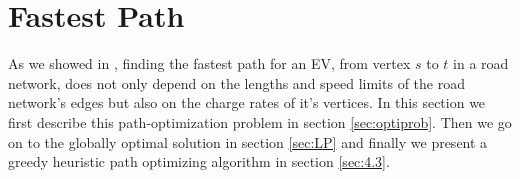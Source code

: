 \section{Fastest Path}

As we showed in , finding the fastest path for an EV, from vertex $s$ to $t$ in a road network, does not only depend on the lengths and speed limits of the road network's edges but also on the charge rates of it's vertices. In this section we first describe this path-optimization problem in section \ref{sec:optiprob}. Then we go on to the globally optimal solution in section \ref{sec:LP} and finally we present a greedy heuristic path optimizing algorithm in section \ref{sec:4.3}.